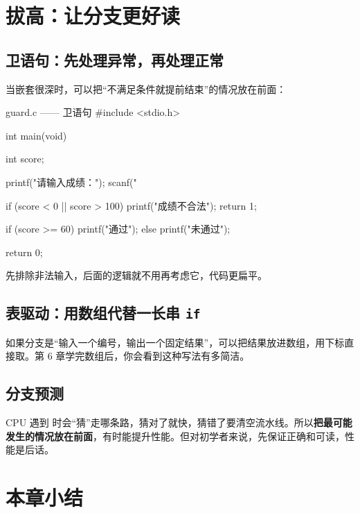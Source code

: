 \section{拔高：让分支更好读}

\subsection{卫语句：先处理异常，再处理正常}

当嵌套很深时，可以把“不满足条件就提前结束”的情况放在前面：

\begin{codebox}{guard.c —— 卫语句}
#include <stdio.h>

int main(void)
{
    int score;

    printf("请输入成绩：");
    scanf("%

    if (score < 0 || score > 100) {
        printf("成绩不合法\n");
        return 1;
    }

    if (score >= 60) {
        printf("通过\n");
    } else {
        printf("未通过\n");
    }

    return 0;
}
\end{codebox}

先排除非法输入，后面的逻辑就不用再考虑它，代码更扁平。

\subsection{表驱动：用数组代替一长串 \texttt{if}}

如果分支是“输入一个编号，输出一个固定结果”，可以把结果放进数组，用下标直接取。第 6 章学完数组后，你会看到这种写法有多简洁。

\subsection{分支预测}

CPU 遇到  时会“猜”走哪条路，猜对了就快，猜错了要清空流水线。所以\textbf{把最可能发生的情况放在前面}，有时能提升性能。但对初学者来说，先保证正确和可读，性能是后话。

\section{本章小结}

